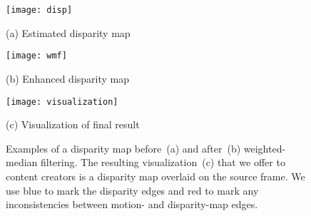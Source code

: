 \begin{figure}[t]
	\begin{minipage}[b]{0.49\linewidth}
		\centering
		\centerline{ \texttt{[image: disp]} }
		\centerline{\scriptsize{(a) Estimated disparity map }}\medskip
	\end{minipage}
	\hfill
	\begin{minipage}[b]{0.49\linewidth}
		\centering
		\centerline{\texttt{[image: wmf]} }
		\centerline{\scriptsize{(b) Enhanced disparity map}}\medskip
	\end{minipage}
	\begin{minipage}[b]{1\linewidth}
		\centering
		\centerline{\texttt{[image: visualization]} }
		\centerline{\scriptsize{(c) Visualization of final result }}
	\end{minipage}
    \caption{Examples of a disparity map before~(a) and after~(b) weighted-median
        filtering. The resulting visualization~(c) that we offer to content
        creators is a disparity map overlaid on the source frame. We use blue to mark
        the disparity edges and red to mark any inconsistencies
        between motion- and disparity-map edges.}
	\label{fig:disp}
\end{figure}
